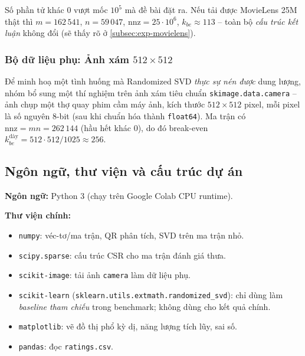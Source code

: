 Số phần tử khác $0$ vượt mốc $10^5$ mà đề bài đặt ra. Nếu tải được MovieLens
25M thật thì $m = 162\,541$, $n = 59\,047$, $\mathrm{nnz} = 25\cdot 10^6$,
$k_{be} \approx 113$ -- toàn bộ \emph{cấu trúc kết luận} không đổi (sẽ thấy
rõ ở \cref{subsec:exp-movielens}).

\subsubsection{Bộ dữ liệu phụ: Ảnh xám $512\times 512$}\label{subsubsec:image}

Để minh hoạ một tình huống mà Randomized SVD \emph{thực sự nén được} dung
lượng, nhóm bổ sung một thí nghiệm trên ảnh xám tiêu chuẩn
\texttt{skimage.data.camera} -- ảnh chụp một thợ quay phim cầm máy ảnh, kích
thước $512 \times 512$ pixel, mỗi pixel là số nguyên 8-bit (sau khi chuẩn hóa
thành \texttt{float64}). Ma trận có $\mathrm{nnz} = m n = 262\,144$ (hầu hết
khác $0$), do đó break-even
$k_{be}^{\text{dày}} = 512 \cdot 512 / 1025 \approx 256$.

\subsection{Ngôn ngữ, thư viện và cấu trúc dự án}\label{subsec:tools}

\textbf{Ngôn ngữ:} Python 3 (chạy trên Google Colab CPU runtime).

\textbf{Thư viện chính:}
\begin{itemize}
    \item \texttt{numpy}: véc-tơ/ma trận, QR phân tích, SVD trên ma trận nhỏ.
    \item \texttt{scipy.sparse}: cấu trúc CSR cho ma trận đánh giá thưa.
    \item \texttt{scikit-image}: tải ảnh \texttt{camera} làm dữ liệu phụ.
    \item \texttt{scikit-learn} (\texttt{sklearn.utils.extmath.randomized\_svd}):
    chỉ dùng làm \emph{baseline tham chiếu} trong benchmark; không dùng cho
    kết quả chính.
    \item \texttt{matplotlib}: vẽ đồ thị phổ kỳ dị, năng lượng tích lũy, sai số.
    \item \texttt{pandas}: đọc \texttt{ratings.csv}.
\end{itemize}

